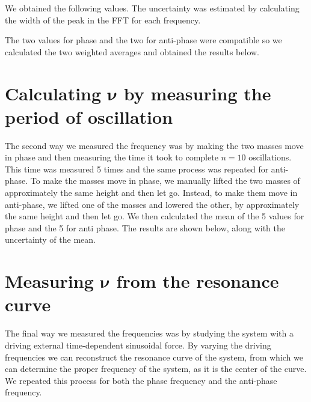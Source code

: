 \documentclass{article}
\begin{document}
We obtained the following values. The uncertainty was estimated by calculating the width of the peak in the FFT for each frequency.

The two values for phase and the two for anti-phase were compatible so we calculated the two weighted averages and obtained the results below.


\section{Calculating $\bm \nu$ by measuring the period of oscillation}

The second way we measured the frequency was by making the two masses move in phase and then measuring the time it took to complete $n=10$ oscillations. This time was measured 5 times and the same process was repeated for anti-phase. To make the masses move in phase, we manually lifted the two masses of approximately the same height and then let go. Instead, to make them move in anti-phase, we lifted one of the masses and lowered the other, by approximately the same height and then let go.
We then calculated the mean of the 5 values for phase and the 5 for anti phase. The results are shown below, along with the uncertainty of the mean. 


\section{Measuring $ \bm \nu $ from the resonance curve}
The final way we measured the frequencies was by studying the system with a driving external time-dependent sinusoidal force. By varying the driving frequencies we can reconstruct the resonance curve of the system, from which we can determine the proper frequency of the system, as it is the center of the curve. We repeated this process for both the phase frequency and the anti-phase frequency.
\end{document}
